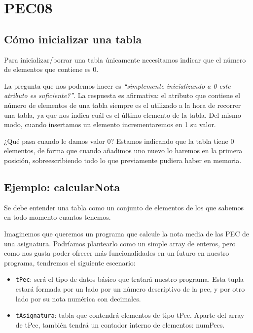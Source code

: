 \documentclass[
]{book}
\providecommand{\tightlist}{%
  \setlength{\itemsep}{0pt}\setlength{\parskip}{0pt}}
\begin{document}
\hypertarget{pec08}{%
\chapter{PEC08}\label{pec08}}

\hypertarget{cuxf3mo-inicializar-una-tabla}{%
\section{Cómo inicializar una tabla}\label{cuxf3mo-inicializar-una-tabla}}

Para inicializar/borrar una tabla únicamente necesitamos indicar que el número de elementos que contiene es 0.

La pregunta que nos podemos hacer es \emph{``simplemente inicializando a 0 este atributo es suficiente?''}. La respuesta es afirmativa: el atributo que contiene el número de elementos de una tabla siempre es el utilizado a la hora de recorrer una tabla, ya que nos indica cuál es el último elemento de la tabla. Del mismo modo, cuando insertamos un elemento incrementaremos en 1 su valor.

¿Qué pasa cuando le damos valor 0? Estamos indicando que la tabla tiene 0 elementos, de forma que cuando añadimos uno nuevo lo haremos en la primera posición, sobreescribiendo todo lo que previamente pudiera haber en memoria.

\hypertarget{ejemplo-calcularnota}{%
\section{Ejemplo: calcularNota}\label{ejemplo-calcularnota}}

Se debe entender una tabla como un conjunto de elementos de los que sabemos en todo momento cuantos tenemos.

Imaginemos que queremos un programa que calcule la nota media de las PEC de una asignatura. Podríamos plantearlo como un simple array de enteros, pero como nos gusta poder ofrecer más funcionalidades en un futuro en nuestro programa, tendremos el siguiente escenario:

\begin{itemize}
\tightlist
\item
  \texttt{tPec}: será el tipo de datos básico que tratará nuestro programa. Esta tupla estará formada por un lado por un número descriptivo de la pec, y por otro lado por su nota numérica con decimales.
\item
  \texttt{tAsignatura}: tabla que contendrá elementos de tipo tPec. Aparte del array de tPec, también tendrá un contador interno de elementos: numPecs.
\end{itemize}
\end{document}
